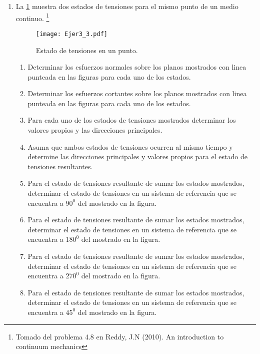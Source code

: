 \documentclass[../notas medios.tex]{subfiles}
\begin{document}
\begin{enumerate}
\item \label{punto03} La  \cref{planos} muestra dos estados de tensiones
para el mismo punto de un medio continuo. \footnote{Tomado del problema 4.8 en Reddy, J.N (2010). An introduction to continuum mechanics}
%
\begin{figure}[H]
	\centering
	\texttt{[image: Ejer3\_3.pdf]}
	\caption{Estado de tensiones en un punto.}
	\label{planos}
\end{figure}
\begin{enumerate}
	\item Determinar los esfuerzos normales sobre los planos mostrados con linea punteada en las figuras para cada uno de los estados.
	\item Determinar los esfuerzos cortantes sobre los planos mostrados con linea punteada en las figuras para cada uno de los estados.
	\item Para cada uno de los estados de tensiones mostrados determinar los valores propios y las direcciones principales.
	\item Asuma que ambos estados de tensiones ocurren al mismo tiempo y determine las direcciones principales y valores propios para el estado de tensiones resultantes.
	\item Para el estado de tensiones resultante de sumar los estados mostrados, determinar el estado de tensiones en un sistema de referencia que se encuentra a $90^0$ del mostrado en la figura.
	\item Para el estado de tensiones resultante de sumar los estados mostrados, determinar el estado de tensiones en un sistema de referencia que se encuentra a $180^0$ del mostrado en la figura.
	\item Para el estado de tensiones resultante de sumar los estados mostrados, determinar el estado de tensiones en un sistema de referencia que se encuentra a $270^0$ del mostrado en la figura.
	\item Para el estado de tensiones resultante de sumar los estados mostrados, determinar el estado de tensiones en un sistema de referencia que se encuentra a $45^0$ del mostrado en la figura.
\end{enumerate}


\end{enumerate}
\end{document}
